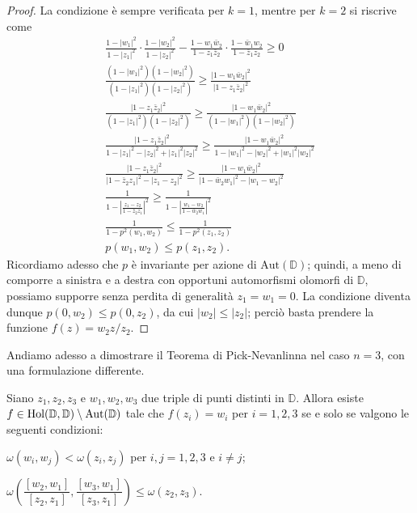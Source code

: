 \begin{proof}
  La condizione è sempre verificata per $k=1$, mentre per $k=2$ si riscrive come
  \begin{gather*}
    \frac{1-|w_1|^2}{1-|z_1|^2}\cdot\frac{1-|w_2|^2}{1-|z_2|^2}-\frac{1-w_1\bar{w}_2}{1-z_1\bar{z}_2}\cdot\frac{1-\bar{w}_1w_2}{1-\bar{z}_1z_2} \ge 0 \\
    \frac{(1-|w_1|^2)(1-|w_2|^2)}{(1-|z_1|^2)(1-|z_2|^2)} \ge \frac{|1-w_1\bar{w}_2|^2}{|1-z_1\bar{z}_2|^2} \\
    \frac{|1-z_1\bar{z}_2|^2}{(1-|z_1|^2)(1-|z_2|^2)} \ge \frac{|1-w_1\bar{w}_2|^2}{(1-|w_1|^2)(1-|w_2|^2)} \\
    \frac{|1-z_1\bar{z}_2|^2}{1-|z_1|^2-|z_2|^2+|z_1|^2|z_2|^2} \ge \frac{|1-w_1\bar{w}_2|^2}{1-|w_1|^2-|w_2|^2+|w_1|^2|w_2|^2} \\
    \frac{|1-z_1\bar{z}_2|^2}{|1-\bar{z}_2z_1|^2-|z_1-z_2|^2} \ge \frac{|1-w_1\bar{w}_2|^2}{|1-\bar{w}_2w_1|^2-|w_1-w_2|^2} \\
    \frac{1}{1-\left|\frac{z_1-z_2}{1-\bar{z}_2z_1}\right|^2} \ge \frac{1}{1-\left|\frac{w_1-w_2}{1-\bar{w}_2w_1}\right|^2} \\
    \frac{1}{1-p^2(w_1,w_2)} \le \frac{1}{1-p^2(z_1,z_2)} \\
    p(w_1,w_2) \le p(z_1,z_2).
  \end{gather*}
  Ricordiamo adesso che $p$ è invariante per azione di $\text{Aut}(\mathbb{D})$; quindi, a meno di comporre a sinistra e a destra con opportuni automorfismi olomorfi di $\mathbb{D}$, possiamo supporre senza perdita di generalità $z_1=w_1=0$. La condizione diventa dunque $p(0,w_2) \le p(0,z_2)$, da cui $|w_2| \le |z_2|$; perciò basta prendere la funzione $f(z)=w_2z/z_2$.
\end{proof}

Andiamo adesso a dimostrare il Teorema di Pick-Nevanlinna nel caso $n=3$, con una formulazione differente.

\begin{thm}
  Siano $z_1, z_2, z_3$ e $w_1, w_2, w_3$ due triple di punti distinti in $\mathbb{D}$. Allora esiste $f \in \normalfont{\text{Hol}}(\mathbb{D},\mathbb{D}) \setminus \normalfont{\text{Aut}}(\mathbb{D})$ tale che $f(z_i)=w_i$ per $i=1,2,3$ se e solo se valgono le seguenti condizioni:
  \begin{nlist}
    \item $\omega(w_i,w_j)<\omega(z_i,z_j)$ per $i,j=1,2,3$ e $i\not=j$;
    \item $\omega\left(\dfrac{[w_2,w_1]}{[z_2,z_1]},\dfrac{[w_3,w_1]}{[z_3,z_1]}\right) \le \omega(z_2,z_3)$.
  \end{nlist}
\end{thm}

